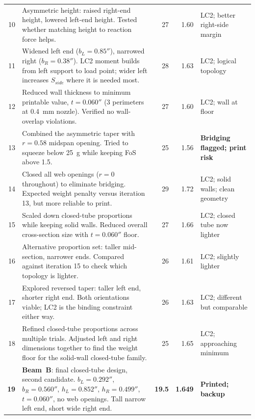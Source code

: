\documentclass[11pt,letterpaper]{article}
\begin{document}
\begin{table}[H]
\begin{tabular}{rp{7.5cm}rrl}
10 & Asymmetric height: raised right-end height, lowered left-end height.
     Tested whether matching height to reaction force helps.
   & 27 & 1.60 & LC2; better right-side margin \\[2pt]

11 & Widened left end ($b_L = 0.85''$), narrowed right ($b_R = 0.38''$).
     LC2 moment builds from left support to load point; wider left increases
     $S_{side}$ where it is needed most.
   & 28 & 1.63 & LC2; logical topology \\[2pt]

12 & Reduced wall thickness to minimum printable value, $t = 0.060''$
     (3 perimeters at 0.4~mm nozzle).  Verified no wall-overlap violations.
   & 27 & 1.60 & LC2; wall at floor \\[2pt]

13 & Combined the asymmetric taper with $r = 0.58$ midspan opening.
     Tried to squeeze below 25~g while keeping FoS above 1.5.
   & 25 & 1.56 & \textbf{Bridging flagged; print risk} \\[2pt]

14 & Closed all web openings ($r = 0$ throughout) to eliminate bridging.
     Expected weight penalty versus iteration 13, but more reliable to print.
   & 29 & 1.72 & LC2; solid walls; clean geometry \\[2pt]

15 & Scaled down closed-tube proportions while keeping solid walls.
     Reduced overall cross-section size with $t = 0.060''$ floor.
   & 27 & 1.66 & LC2; closed tube now lighter \\[2pt]

16 & Alternative proportion set: taller mid-section, narrower ends.
     Compared against iteration 15 to check which topology is lighter.
   & 26 & 1.61 & LC2; slightly lighter \\[2pt]

17 & Explored reversed taper: taller left end, shorter right end.
     Both orientations viable; LC2 is the binding constraint either way.
   & 26 & 1.63 & LC2; different but comparable \\[2pt]

18 & Refined closed-tube proportions across multiple trials.
     Adjusted left and right dimensions together to find the weight floor
     for the solid-wall closed-tube family.
   & 25 & 1.65 & LC2; approaching minimum \\[2pt]

\textbf{19} &
  \textbf{Beam~B}: final closed-tube design, second candidate.
  $b_L = 0.292''$, $b_R = 0.560''$, $h_L = 0.852''$, $h_R = 0.499''$,
  $t = 0.060''$, no web openings.  Tall narrow left end, short wide right end.
  & \textbf{19.5} & \textbf{1.649} & \textbf{Printed; backup} \\[6pt]


\end{tabular}
\end{table}
\end{document}
